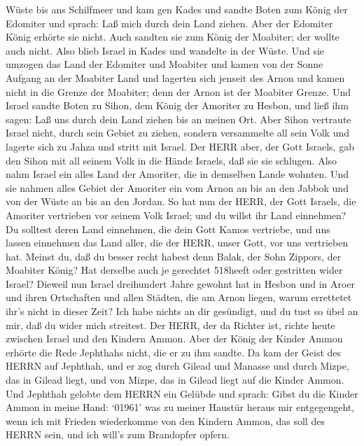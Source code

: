 Wüste bis ans Schilfmeer und kam gen Kades  und sandte
Boten zum König der Edomiter und sprach: Laß mich durch dein Land
ziehen. Aber der Edomiter König erhörte sie nicht. Auch sandten sie zum
König der Moabiter; der wollte auch nicht. Also blieb Israel in Kades
 und wandelte in der Wüste. Und sie umzogen das Land der
Edomiter und Moabiter und kamen von der Sonne Aufgang an der Moabiter
Land und lagerten sich jenseit des Arnon und kamen nicht in die Grenze
der Moabiter; denn der Arnon ist der Moabiter Grenze.  Und
Israel sandte Boten zu Sihon, dem König der Amoriter zu Hesbon, und ließ
ihm sagen: Laß uns durch dein Land ziehen bis an meinen Ort.
 Aber Sihon vertraute Israel nicht, durch sein Gebiet zu
ziehen, sondern versammelte all sein Volk und lagerte sich zu Jahza und
stritt mit Israel.  Der HERR aber, der Gott Israels, gab
den Sihon mit all seinem Volk in die Hände Israels, daß sie sie
schlugen. Also nahm Israel ein alles Land der Amoriter, die in demselben
Lande wohnten.  Und sie nahmen alles Gebiet der Amoriter
ein vom Arnon an bis an den Jabbok und von der Wüste an bis an den
Jordan.  So hat nun der HERR, der Gott Israels, die
Amoriter vertrieben vor seinem Volk Israel; und du willst ihr Land
einnehmen?  Du solltest deren Land einnehmen, die dein Gott
Kamos vertriebe, und uns lassen einnehmen das Land aller, die der HERR,
unser Gott, vor uns vertrieben hat.  Meinst du, daß du
besser recht habest denn Balak, der Sohn Zippors, der Moabiter König?
Hat derselbe auch je gerechtet 518heeft oder gestritten wider Israel?
 Dieweil nun Israel dreihundert Jahre gewohnt hat in Hesbon
und in Aroer und ihren Ortschaften und allen Städten, die am Arnon
liegen, warum errettetet ihr's nicht in dieser Zeit?  Ich
habe nichts an dir gesündigt, und du tust so übel an mir, daß du wider
mich streitest. Der HERR, der da Richter ist, richte heute zwischen
Israel und den Kindern Ammon.  Aber der König der Kinder
Ammon erhörte die Rede Jephthahs nicht, die er zu ihm sandte.
 Da kam der Geist des HERRN auf Jephthah, und er zog durch
Gilead und Manasse und durch Mizpe, das in Gilead liegt, und von Mizpe,
das in Gilead liegt auf die Kinder Ammon.  Und Jephthah
gelobte dem HERRN ein Gelübde und sprach: Gibst du die Kinder Ammon in
meine Hand:  `01961' was zu meiner Haustür heraus mir
entgegengeht, wenn ich mit Frieden wiederkomme von den Kindern Ammon,
das soll des HERRN sein, und ich will's zum Brandopfer opfern.
